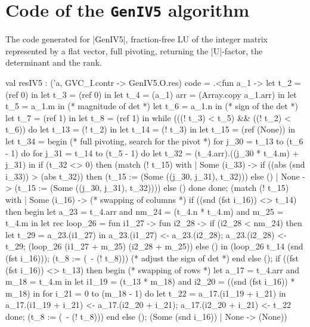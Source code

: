 \documentclass{elsart}
\begin{document}
\section{Code of the \texttt{GenIV5} algorithm}
\label{app:code-GenIV5}
The code generated for |GenIV5|, fraction-free LU of the integer matrix
represented by a flat vector, full pivoting, returning the |U|-factor,
the determinant and the rank.
\begin{code2}
val resIV5 : ('a, GVC_I.contr -> GenIV5.O.res) code =
  .<fun a_1 ->
   let t_2 = (ref 0) in
   let t_3 = (ref 0) in
   let t_4 = (a_1) {arr = (Array.copy a_1.arr)} in
   let t_5 = a_1.m in  (* magnitude of det *)
   let t_6 = a_1.n in  (* sign of the det *)
   let t_7 = (ref 1) in
   let t_8 = (ref 1) in
   while (((! t_3) < t_5) && ((! t_2) < t_6)) do
    let t_13 = (! t_2) in
    let t_14 = (! t_3) in
    let t_15 = (ref (None)) in
    let t_34 =
     begin (* full pivoting, search for the pivot *)
      for j_30 = t_13 to (t_6 - 1) do
       for j_31 = t_14 to (t_5 - 1) do
        let t_32 = (t_4.arr).((j_30 * t_4.m) + j_31) in
        if (t_32 <> 0) then
         (match (! t_15) with
          | Some (i_33) ->
             if ((abs (snd i_33)) > (abs t_32)) then
              (t_15 := (Some ((j_30, j_31), t_32)))
             else ()
          | None -> (t_15 := (Some ((j_30, j_31), t_32))))
        else ()
       done
      done;
      (match (! t_15) with
       | Some (i_16) -> (* swapping of columns *)
          if ((snd (fst i_16)) <> t_14) then begin
           let a_23 = t_4.arr
           and nm_24 = (t_4.n * t_4.m)
           and m_25 = t_4.m in
           let rec loop_26 =
            fun i1_27 ->
             fun i2_28 ->
              if (i2_28 < nm_24) then
               let t_29 = a_23.(i1_27) in
               a_23.(i1_27) <- a_23.(i2_28);
               a_23.(i2_28) <- t_29;
               (loop_26 (i1_27 + m_25) (i2_28 + m_25))
              else () in
           (loop_26 t_14 (snd (fst i_16)));
           (t_8 := (~- (! t_8))) (* adjust the sign of det *)
          end else ();
          if ((fst (fst i_16)) <> t_13) then begin (* swapping of rows *)
           let a_17 = t_4.arr
           and m_18 = t_4.m in
           let i1_19 = (t_13 * m_18)
           and i2_20 = ((snd (fst i_16)) * m_18) in
           for i_21 = 0 to (m_18 - 1) do
            let t_22 = a_17.(i1_19 + i_21) in
            a_17.(i1_19 + i_21) <- a_17.(i2_20 + i_21);
            a_17.(i2_20 + i_21) <- t_22
           done;
           (t_8 := (~- (! t_8)))
          end else ();
          (Some (snd i_16))
       | None -> (None))

\end{code2}
\end{document}
